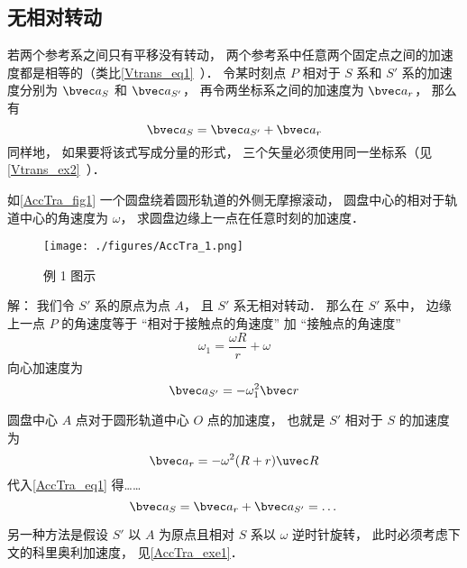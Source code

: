 

\subsection{无相对转动}
若两个参考系之间只有平移没有转动， 两个参考系中任意两个固定点之间的加速度都是相等的（类比\autoref{Vtrans_eq1}~）． 令某时刻点 $P$ 相对于 $S$ 系和 $S'$ 系的加速度分别为 $\bvec a_S$ 和 $\bvec a_{S'}$， 再令两坐标系之间的加速度为 $\bvec a_r$， 那么有
\begin{equation}\label{AccTra_eq1}
\bvec a_S = \bvec a_{S'} + \bvec a_r
\end{equation}
同样地， 如果要将该式写成分量的形式， 三个矢量必须使用同一坐标系（见\autoref{Vtrans_ex2}~）．

\begin{example}{}\label{AccTra_ex1}
如\autoref{AccTra_fig1} 一个圆盘绕着圆形轨道的外侧无摩擦滚动， 圆盘中心的相对于轨道中心的角速度为 $\omega$， 求圆盘边缘上一点在任意时刻的加速度．
\begin{figure}[ht]
\centering
\texttt{[image: ./figures/AccTra\_1.png]}
\caption{例 1 图示} \label{AccTra_fig1}
\end{figure}

解： 我们令 $S'$ 系的原点为点 $A$， 且 $S'$ 系无相对转动． 那么在 $S'$ 系中， 边缘上一点 $P$ 的角速度等于 “相对于接触点的角速度” 加 “接触点的角速度”
\begin{equation}
\omega_1 = \frac{\omega R}{r} + \omega
\end{equation}
向心加速度为
\begin{equation}
\bvec a_{S'} = -\omega_1^2 \bvec r
\end{equation}

圆盘中心 $A$ 点对于圆形轨道中心 $O$ 点的加速度， 也就是 $S'$ 相对于 $S$ 的加速度为
\begin{equation}
\bvec a_r = -\omega^2 (R + r)\uvec R
\end{equation}
代入\autoref{AccTra_eq1} 得……
\begin{equation}
\bvec a_S = \bvec a_r + \bvec a_{S'} = \dots
\end{equation}

另一种方法是假设 $S'$ 以 $A$ 为原点且相对 $S$ 系以 $\omega$ 逆时针旋转， 此时必须考虑下文的科里奥利加速度， 见\autoref{AccTra_exe1}．
\end{example}

